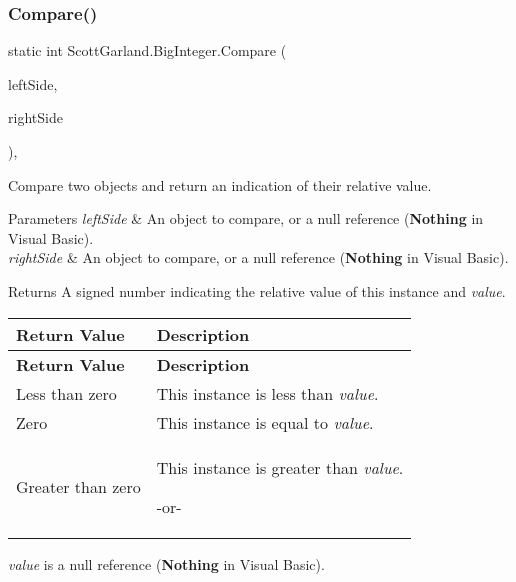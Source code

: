 \subsubsection{\texorpdfstring{Compare()}{Compare()}}
{\footnotesize\ttfamily static int Scott\+Garland.\+Big\+Integer.\+Compare (\begin{DoxyParamCaption}\item[{\hyperlink{class_scott_garland_1_1_big_integer}{Big\+Integer}}]{left\+Side,  }\item[{\hyperlink{class_scott_garland_1_1_big_integer}{Big\+Integer}}]{right\+Side }\end{DoxyParamCaption})\hspace{0.3cm}{\ttfamily [inline]}, {\ttfamily [static]}}



Compare two objects and return an indication of their relative value. 


\begin{DoxyParams}{Parameters}
{\em left\+Side} & An object to compare, or a null reference ({\bfseries Nothing} in Visual Basic).\\
\hline
{\em right\+Side} & An object to compare, or a null reference ({\bfseries Nothing} in Visual Basic).\\
\hline
\end{DoxyParams}
\begin{DoxyReturn}{Returns}
A signed number indicating the relative value of this instance and {\itshape value}. \tabulinesep=1mm
\begin{longtabu} spread 0pt [c]{*{2}{|X[-1]}|}
\hline
\rowcolor{\tableheadbgcolor}\textbf{ Return Value }&\textbf{ Description  }\\
\endfirsthead
\hline
\endfoot
\hline
\rowcolor{\tableheadbgcolor}\textbf{ Return Value }&\textbf{ Description  }\\
\endhead
Less than zero &This instance is less than {\itshape value}.  \\
Zero &This instance is equal to {\itshape value}.  \\
Greater than zero &This instance is greater than {\itshape value}. 

-\/or-\/\\
\end{longtabu}

\end{DoxyReturn}
{\itshape value} is a null reference ({\bfseries Nothing} in Visual Basic).   \mbox{\label{class_scott_garland_1_1_big_integer_af0dbbd3bc5d77875df55f35d92f1e2b6}} 
